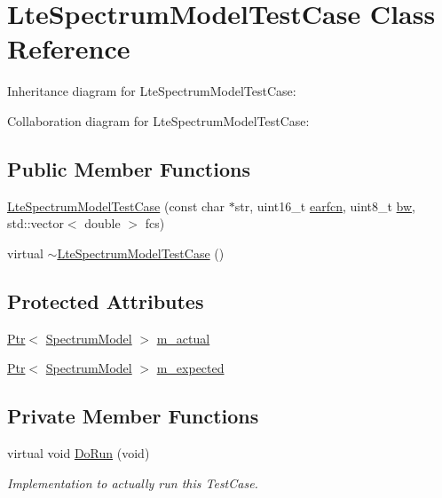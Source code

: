 \hypertarget{classLteSpectrumModelTestCase}{}\section{Lte\+Spectrum\+Model\+Test\+Case Class Reference}
\label{classLteSpectrumModelTestCase}


Inheritance diagram for Lte\+Spectrum\+Model\+Test\+Case\+:


Collaboration diagram for Lte\+Spectrum\+Model\+Test\+Case\+:
\subsection*{Public Member Functions}
\begin{DoxyCompactItemize}
\item 
\hyperlink{classLteSpectrumModelTestCase_a6395f82354ab24ffd4a678130892b2a5}{Lte\+Spectrum\+Model\+Test\+Case} (const char $\ast$str, uint16\+\_\+t \hyperlink{generate__test__data__lte__spectrum__value__txpsd_8m_a584be7562abb392609629331f8c6c42c}{earfcn}, uint8\+\_\+t \hyperlink{lte__ue__measurements_8m_a3f7228a3941f19f282647a09dd494528}{bw}, std\+::vector$<$ double $>$ fcs)
\item 
virtual \hyperlink{classLteSpectrumModelTestCase_a2f6c36f8ee3dadf91d43e3265c3a0059}{$\sim$\+Lte\+Spectrum\+Model\+Test\+Case} ()
\end{DoxyCompactItemize}
\subsection*{Protected Attributes}
\begin{DoxyCompactItemize}
\item 
\hyperlink{classns3_1_1Ptr}{Ptr}$<$ \hyperlink{classns3_1_1SpectrumModel}{Spectrum\+Model} $>$ \hyperlink{classLteSpectrumModelTestCase_a74a35c0db79135c0df3ea56024a6a12c}{m\+\_\+actual}
\item 
\hyperlink{classns3_1_1Ptr}{Ptr}$<$ \hyperlink{classns3_1_1SpectrumModel}{Spectrum\+Model} $>$ \hyperlink{classLteSpectrumModelTestCase_a0926cb79b745e2245101719c1a5eee21}{m\+\_\+expected}
\end{DoxyCompactItemize}
\subsection*{Private Member Functions}
\begin{DoxyCompactItemize}
\item 
virtual void \hyperlink{classLteSpectrumModelTestCase_a4e99aab717dc532427a899bf8cf56e3c}{Do\+Run} (void)
\begin{DoxyCompactList}\small\item\em Implementation to actually run this Test\+Case. \end{DoxyCompactList}\end{DoxyCompactItemize}
